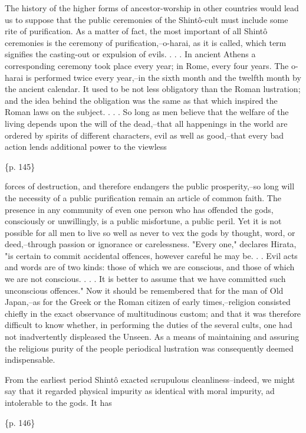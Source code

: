 The history of the higher forms of ancestor-worship in other countries would lead us to suppose that the public ceremonies of the Shintô-cult must include some rite of purification. As a matter of fact, the most important of all Shintô ceremonies is the ceremony of purification,--o-harai, as it is called, which term signifies the casting-out or expulsion of evils. . . . In ancient Athens a corresponding ceremony took place every year; in Rome, every four years. The o-harai is performed twice every year,--in the sixth month and the twelfth month by the ancient calendar. It used to be not less obligatory than the Roman lustration; and the idea behind the obligation was the same as that which inspired the Roman laws on the subject. . . . So long as men believe that the welfare of the living depends upon the will of the dead,--that all happenings in the world are ordered by spirits of different characters, evil as well as good,--that every bad action lends additional power to the viewless

\{p. 145\}

forces of destruction, and therefore endangers the public prosperity,--so long will the necessity of a public purification remain an article of common faith. The presence in any community of even one person who has offended the gods, consciously or unwillingly, is a public misfortune, a public peril. Yet it is not possible for all men to live so well as never to vex the gods by thought, word, or deed,--through passion or ignorance or carelessness. "Every one," declares Hirata, "is certain to commit accidental offences, however careful he may be. . . Evil acts and words are of two kinds: those of which we are conscious, and those of which we are not conscious. . . . It is better to assume that we have committed such unconscious offences." Now it should be remembered that for the man of Old Japan,--as for the Greek or the Roman citizen of early times,--religion consisted chiefly in the exact observance of multitudinous custom; and that it was therefore difficult to know whether, in performing the duties of the several cults, one had not inadvertently displeased the Unseen. As a means of maintaining and assuring the religious purity of the people periodical lustration was consequently deemed indispensable.

From the earliest period Shintô exacted scrupulous cleanliness--indeed, we might say that it regarded physical impurity as identical with moral impurity, ad intolerable to the gods. It has

\{p. 146\}

